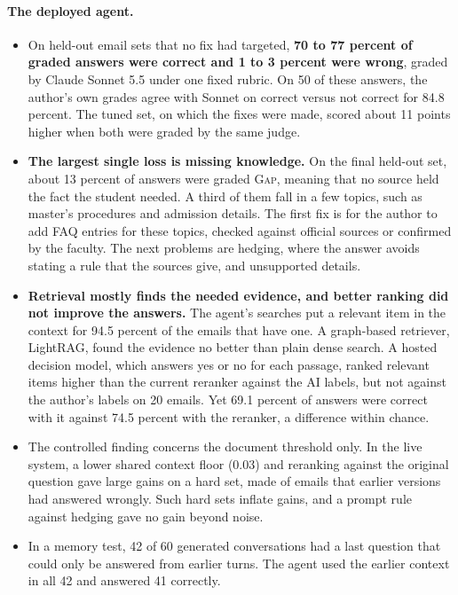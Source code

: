 \paragraph{The deployed agent.}
\begin{itemize}
  \item On held-out email sets that no fix had targeted, \textbf{70 to 77 percent of graded answers were correct and 1 to 3 percent were wrong}, graded by Claude Sonnet 5.5 under one fixed rubric. On 50 of these answers, the author's own grades agree with Sonnet on correct versus not correct for 84.8 percent. The tuned set, on which the fixes were made, scored about 11 points higher when both were graded by the same judge.
  \item \textbf{The largest single loss is missing knowledge.} On the final held-out set, about 13 percent of answers were graded \textsc{Gap}, meaning that no source held the fact the student needed. A third of them fall in a few topics, such as master's procedures and admission details. The first fix is for the author to add FAQ entries for these topics, checked against official sources or confirmed by the faculty. The next problems are hedging, where the answer avoids stating a rule that the sources give, and unsupported details.
  \item \textbf{Retrieval mostly finds the needed evidence, and better ranking did not improve the answers.} The agent's searches put a relevant item in the context for 94.5 percent of the emails that have one. A graph-based retriever, LightRAG, found the evidence no better than plain dense search. A hosted decision model, which answers yes or no for each passage, ranked relevant items higher than the current reranker against the AI labels, but not against the author's labels on 20 emails. Yet 69.1 percent of answers were correct with it against 74.5 percent with the reranker, a difference within chance.
  \item The controlled finding concerns the document threshold only. In the live system, a lower shared context floor (0.03) and reranking against the original question gave large gains on a hard set, made of emails that earlier versions had answered wrongly. Such hard sets inflate gains, and a prompt rule against hedging gave no gain beyond noise.
  \item In a memory test, 42 of 60 generated conversations had a last question that could only be answered from earlier turns. The agent used the earlier context in all 42 and answered 41 correctly.
\end{itemize}

